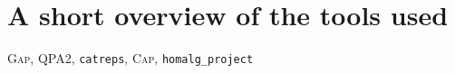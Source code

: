 
\section{A short overview of the tools used}

\textsc{Gap}, \textsc{QPA2}, \texttt{catreps}, \textsc{Cap}, \texttt{homalg\_project}